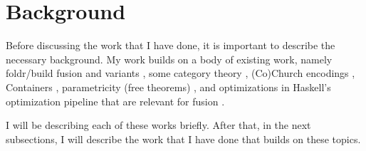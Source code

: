 
\section{Background}
Before discussing the work that I have done, it is important to describe the necessary background.
My work builds on a body of existing work, namely foldr/build fusion and variants \citep{Gill1993,Svenningsson2002,Coutts2007}, some category theory \citep{Ahrens2022}, (Co)Church encodings \citep{Harper2011}, Containers \citep{Abbott2005}, parametricity (free theorems) \citep{Wadler1989}, and optimizations in Haskell's optimization pipeline that are relevant for fusion \citep{Jones1996}.

I will be describing each of these works briefly.
After that, in the next subsections, I will describe the work that I have done that builds on these topics.




